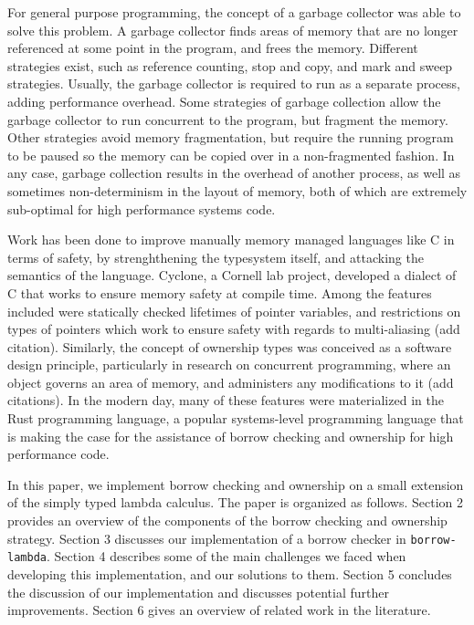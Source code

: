 \documentclass[letterpaper,11pt]{article}
\begin{document}
For general purpose programming, the concept of a garbage collector was able to solve
this problem. A garbage collector finds areas of memory that are no longer referenced
at some point in the program, and frees the memory. Different strategies exist, such
as reference counting, stop and copy, and mark and sweep strategies. Usually, the
garbage collector is required to run as a separate process, adding performance
overhead. Some strategies of garbage collection allow the garbage collector to run
concurrent to the program, but fragment the memory. Other strategies avoid memory
fragmentation, but require the running program to be paused so the memory can be
copied over in a non-fragmented fashion. In any case, garbage collection results
in the overhead of another process, as well as sometimes non-determinism in the layout
of memory, both of which are extremely sub-optimal for high performance systems code.

Work has been done to improve manually memory managed languages like C in terms of
safety, by strenghthening the typesystem itself, and attacking the semantics of the
language. Cyclone, a Cornell lab project, developed a dialect of C that works to
ensure memory safety at compile time. Among the features included were statically
checked lifetimes of pointer variables, and restrictions on types of pointers which
work to ensure safety with regards to multi-aliasing (add citation). Similarly, the
concept of ownership types was conceived as a software design principle, particularly
in research on concurrent programming, where an object governs an area of memory,
and administers any modifications to it (add citations). In the modern day,
many of these features were materialized in the Rust programming language, a popular
systems-level programming language that is making the case for the assistance of
borrow checking and ownership for high performance code.

In this paper, we implement borrow checking and ownership on a small extension of the
simply typed lambda calculus. The paper is organized as follows. Section 2 provides an
overview of the components of the borrow checking and ownership strategy. Section 3
discusses our implementation of a borrow checker in \texttt{borrow-lambda}.
Section 4 describes some of the main challenges we faced when developing this
implementation, and our solutions to them. Section 5 concludes the discussion
of our implementation and discusses potential further improvements. Section 6
gives an overview of related work in the literature.
\end{document}
